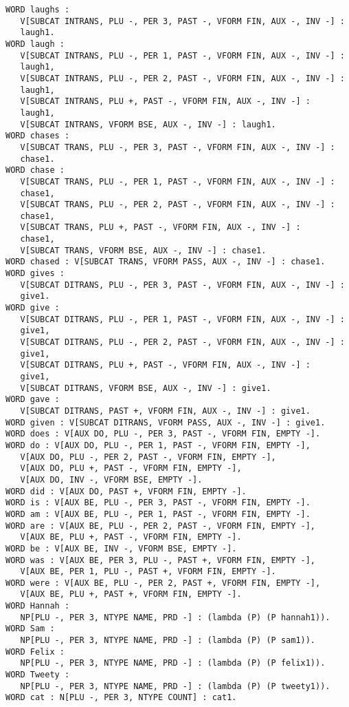 {\begin{verbatim}
WORD laughs : 
   V[SUBCAT INTRANS, PLU -, PER 3, PAST -, VFORM FIN, AUX -, INV -] :
   laugh1.
WORD laugh : 
   V[SUBCAT INTRANS, PLU -, PER 1, PAST -, VFORM FIN, AUX -, INV -] :
   laugh1, 
   V[SUBCAT INTRANS, PLU -, PER 2, PAST -, VFORM FIN, AUX -, INV -] :
   laugh1, 
   V[SUBCAT INTRANS, PLU +, PAST -, VFORM FIN, AUX -, INV -] :
   laugh1, 
   V[SUBCAT INTRANS, VFORM BSE, AUX -, INV -] : laugh1.
WORD chases : 
   V[SUBCAT TRANS, PLU -, PER 3, PAST -, VFORM FIN, AUX -, INV -] :
   chase1.
WORD chase :
   V[SUBCAT TRANS, PLU -, PER 1, PAST -, VFORM FIN, AUX -, INV -] : 
   chase1,
   V[SUBCAT TRANS, PLU -, PER 2, PAST -, VFORM FIN, AUX -, INV -] : 
   chase1,
   V[SUBCAT TRANS, PLU +, PAST -, VFORM FIN, AUX -, INV -] :
   chase1, 
   V[SUBCAT TRANS, VFORM BSE, AUX -, INV -] : chase1.
WORD chased : V[SUBCAT TRANS, VFORM PASS, AUX -, INV -] : chase1.
WORD gives : 
   V[SUBCAT DITRANS, PLU -, PER 3, PAST -, VFORM FIN, AUX -, INV -] :
   give1.
WORD give : 
   V[SUBCAT DITRANS, PLU -, PER 1, PAST -, VFORM FIN, AUX -, INV -] :
   give1, 
   V[SUBCAT DITRANS, PLU -, PER 2, PAST -, VFORM FIN, AUX -, INV -] :
   give1, 
   V[SUBCAT DITRANS, PLU +, PAST -, VFORM FIN, AUX -, INV -] :
   give1, 
   V[SUBCAT DITRANS, VFORM BSE, AUX -, INV -] : give1.
WORD gave :
   V[SUBCAT DITRANS, PAST +, VFORM FIN, AUX -, INV -] : give1.
WORD given : V[SUBCAT DITRANS, VFORM PASS, AUX -, INV -] : give1.
WORD does : V[AUX DO, PLU -, PER 3, PAST -, VFORM FIN, EMPTY -].
WORD do : V[AUX DO, PLU -, PER 1, PAST -, VFORM FIN, EMPTY -], 
   V[AUX DO, PLU -, PER 2, PAST -, VFORM FIN, EMPTY -], 
   V[AUX DO, PLU +, PAST -, VFORM FIN, EMPTY -], 
   V[AUX DO, INV -, VFORM BSE, EMPTY -].
WORD did : V[AUX DO, PAST +, VFORM FIN, EMPTY -].
WORD is : V[AUX BE, PLU -, PER 3, PAST -, VFORM FIN, EMPTY -].
WORD am : V[AUX BE, PLU -, PER 1, PAST -, VFORM FIN, EMPTY -].
WORD are : V[AUX BE, PLU -, PER 2, PAST -, VFORM FIN, EMPTY -], 
   V[AUX BE, PLU +, PAST -, VFORM FIN, EMPTY -].
WORD be : V[AUX BE, INV -, VFORM BSE, EMPTY -].
WORD was : V[AUX BE, PER 3, PLU -, PAST +, VFORM FIN, EMPTY -], 
   V[AUX BE, PER 1, PLU -, PAST +, VFORM FIN, EMPTY -].
WORD were : V[AUX BE, PLU -, PER 2, PAST +, VFORM FIN, EMPTY -], 
   V[AUX BE, PLU +, PAST +, VFORM FIN, EMPTY -].
WORD Hannah :
   NP[PLU -, PER 3, NTYPE NAME, PRD -] : (lambda (P) (P hannah1)).
WORD Sam :
   NP[PLU -, PER 3, NTYPE NAME, PRD -] : (lambda (P) (P sam1)).
WORD Felix :
   NP[PLU -, PER 3, NTYPE NAME, PRD -] : (lambda (P) (P felix1)).
WORD Tweety :
   NP[PLU -, PER 3, NTYPE NAME, PRD -] : (lambda (P) (P tweety1)).
WORD cat : N[PLU -, PER 3, NTYPE COUNT] : cat1.

\end{verbatim}}
